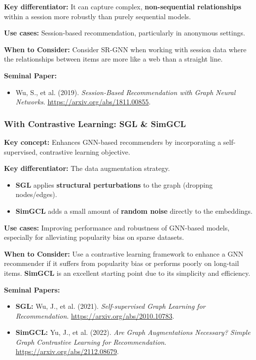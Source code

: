 \documentclass{article}
\begin{document}
\noindent\textbf{Key differentiator:} It can capture complex, \textbf{non-sequential relationships} within a session more robustly than purely sequential models.

\noindent\textbf{Use cases:} Session-based recommendation, particularly in anonymous settings.

\noindent\textbf{When to Consider:} Consider SR-GNN when working with session data where the relationships between items are more like a web than a straight line.

\noindent\textbf{Seminal Paper:}
    \begin{itemize}
        \item Wu, S., et al. (2019). \textit{Session-Based Recommendation with Graph Neural Networks}. \url{https://arxiv.org/abs/1811.00855}.
    \end{itemize}

    \subsubsection{With Contrastive Learning: SGL \& SimGCL}
\noindent\textbf{Key concept:} Enhances GNN-based recommenders by incorporating a self-supervised, contrastive learning objective.

\noindent\textbf{Key differentiator:} The data augmentation strategy.
    \begin{itemize}
        \item \textbf{SGL} applies \textbf{structural perturbations} to the graph (dropping nodes/edges).
        \item \textbf{SimGCL} adds a small amount of \textbf{random noise} directly to the embeddings.
    \end{itemize}
\noindent\textbf{Use cases:} Improving performance and robustness of GNN-based models, especially for alleviating popularity bias on sparse datasets.

\noindent\textbf{When to Consider:} Use a contrastive learning framework to enhance a GNN recommender if it suffers from popularity bias or performs poorly on long-tail items. \textbf{SimGCL} is an excellent starting point due to its simplicity and efficiency.

\noindent\textbf{Seminal Papers:}
    \begin{itemize}
        \item \textbf{SGL:} Wu, J., et al. (2021). \textit{Self-supervised Graph Learning for Recommendation}. \url{https://arxiv.org/abs/2010.10783}.
        \item \textbf{SimGCL:} Yu, J., et al. (2022). \textit{Are Graph Augmentations Necessary? Simple Graph Contrastive Learning for Recommendation}. \url{https://arxiv.org/abs/2112.08679}.
    \end{itemize}
    
\end{document}
